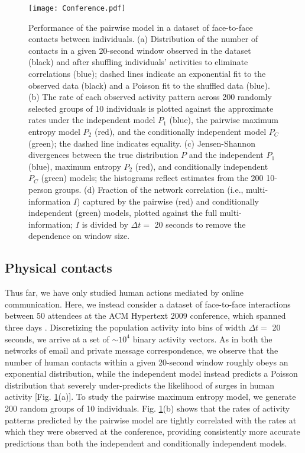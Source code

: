 \documentclass[aps,reprint,superscriptaddress,amsmath,amssymb,longbibliography]{revtex4-1}
\begin{document}
\begin{figure}
\texttt{[image: Conference.pdf]}
\caption{\label{Conference_fig} Performance of the pairwise model in a dataset of face-to-face contacts between individuals. (a) Distribution of the number of contacts in a given 20-second window observed in the dataset (black) and after shuffling individuals' activities to eliminate correlations (blue); dashed lines indicate an exponential fit to the observed data (black) and a Poisson fit to the shuffled data (blue). (b) The rate of each observed activity pattern across 200 randomly selected groups of 10 individuals is plotted against the approximate rates under the independent model $P_1$ (blue), the pairwise maximum entropy model $P_2$ (red), and the conditionally independent model $P_C$ (green); the dashed line indicates equality. (c) Jensen-Shannon divergences between the true distribution $P$ and the independent $P_1$ (blue), maximum entropy $P_2$ (red), and conditionally independent $P_C$ (green) models; the histograms reflect estimates from the 200 10-person groups. (d) Fraction of the network correlation (i.e., multi-information $I$) captured by the pairwise (red) and conditionally independent (green) models, plotted against the full multi-information; $I$ is divided by $\Delta t = $ 20 seconds to remove the dependence on window size.}
\end{figure}

\subsection{Physical contacts}

\label{Conference}

Thus far, we have only studied human actions mediated by online communication. Here, we instead consider a dataset of face-to-face interactions between 50 attendees at the ACM Hypertext 2009 conference, which spanned three days \cite{Isella-01}. Discretizing the population activity into bins of width $\Delta t = $ 20 seconds, we arrive at a set of $\sim 10^4$ binary activity vectors. As in both the networks of email and private message correspondence, we observe that the number of human contacts within a given 20-second window roughly obeys an exponential distribution, while the independent model instead predicts a Poisson distribution that severely under-predicts the likelihood of surges in human activity [Fig. \ref{Conference_fig}(a)]. To study the pairwise maximum entropy model, we generate 200 random groups of 10 individuals. Fig. \ref{Conference_fig}(b) shows that the rates of activity patterns predicted by the pairwise model are tightly correlated with the rates at which they were observed at the conference, providing consistently more accurate predictions than both the independent  and conditionally independent models.
\end{document}
